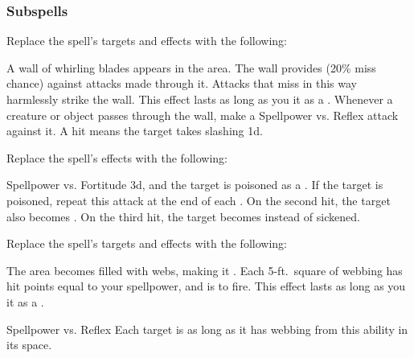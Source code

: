 \subsubsection{Subspells}
Replace the spell's targets and effects with the following:
\begin{spellcontent}
\begin{augmenttargetinginfo}
\end{augmenttargetinginfo}
\begin{augmenteffects}
\spelleffect
A wall of whirling blades appears in the area.
The wall provides  (20\% miss chance) against attacks made through it.
Attacks that miss in this way harmlessly strike the wall.
This effect lasts as long as you  it as a .
Whenever a creature or object passes through the wall, make a Spellpower vs. Reflex attack against it.
A hit means the target takes slashing  \minus1d.
\end{augmenteffects}
\end{spellcontent}
Replace the spell's effects with the following:
\begin{spellcontent}
\begin{augmenteffects}
\begin{spellattack}{Spellpower vs. Fortitude}
\spellsuccess
{} \minus3d, and the target is poisoned as a .
If the target is poisoned, repeat this attack at the end of each .
On the second hit, the target also becomes .
On the third hit, the target becomes  instead of sickened.
\end{spellattack}
\end{augmenteffects}
\end{spellcontent}
Replace the spell's targets and effects with the following:
\begin{spellcontent}
\begin{augmenttargetinginfo}
\end{augmenttargetinginfo}
\begin{augmenteffects}
\spelleffect
The area becomes filled with webs, making it .
Each 5-ft.\ square of webbing has hit points equal to your spellpower, and is  to fire.
This effect lasts as long as you  it as a .
\begin{spellattack}{Spellpower vs. Reflex}
\spellsuccess
Each target is \immobilized as long as it has webbing from this ability in its space.
\end{spellattack}
\end{augmenteffects}
\end{spellcontent}
